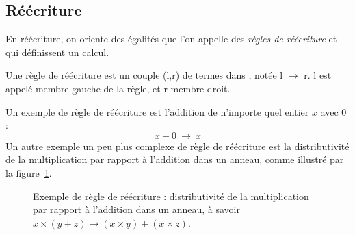 %


\subsection{Réécriture}

En réécriture, on oriente des égalités que l'on appelle des \emph{règles de
réécriture} et qui définissent un calcul.

\begin{definition}
Une règle de réécriture est un couple (l,r) de termes dans \TFX, notée l
$\rightarrow$ r. l est appelé membre gauche de la règle, et r membre droit.
\end{definition}

Un exemple de règle de réécriture est l'addition de n'importe quel entier $x$
avec $0$ : $$x+0~\rightarrow~x$$
Un autre exemple un peu plus complexe de règle de réécriture est la
distributivité de la multiplication par rapport à l'addition dans un anneau,
comme illustré par la figure~\ref{fig:ex_rwRule_distrib}. %
\begin{figure}[!h]
  \begin{center}
    
    \caption{Exemple de règle de réécriture : distributivité de la
    multiplication par rapport à l'addition dans un anneau, à savoir $x\times(y+z)
  \rightarrow (x\times y)+(x\times z)$.}
    \label{fig:ex_rwRule_distrib}
  \end{center}
\end{figure}

